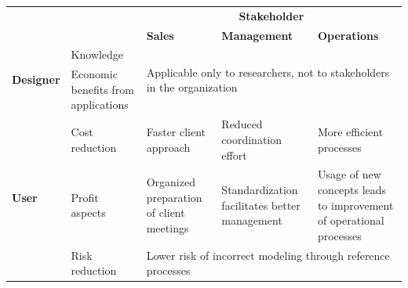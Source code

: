 \begin{table}[caption={Benefits of Reference Modelling for BPO-providers in CRM }, label=tab:refmodbpobenefits]
	\centering
	\begin{tabular}{p{1cm} p{2cm} |p{3cm} | p{3cm} | p{3cm} |}
		\cline{3-5}
		&                                     & \multicolumn{3}{c|}{\textbf{Stakeholder}}                                                                                                                                           \\ \cline{3-5} 
		&                                     & \textbf{Sales}                                          & \textbf{Management}                                 & \textbf{Operations}                                                 \\ \hline
		\multicolumn{1}{|l|}{\multirow{2}{*}{\textbf{Designer}}} & Knowledge                           & \multicolumn{3}{p{3cm}|}{\multirow{2}{*}{\parbox[c]{9cm}{Applicable only to researchers, not to stakeholders in the organization}}}                                                                       \\ \cline{2-2}
		\multicolumn{1}{|l|}{}                                   & Economic benefits from applications & \multicolumn{3}{l|}{}                                                                                                                                                               \\ \hline
		\multicolumn{1}{|l|}{\multirow{5}{*}{\textbf{User}}}     & Cost reduction                      & Faster client approach                                  & Reduced coordination effort                         & More efficient processes                                            \\ \cline{2-5} 
		\multicolumn{1}{|l|}{}                                   & Profit aspects                      & Organized preparation of client meetings                & Standardization facilitates better management       & Usage of new concepts leads to improvement of operational processes \\ \cline{2-5} 
		\multicolumn{1}{|l|}{}                                   & Risk reduction                      & \multicolumn{3}{l|}{\parbox[t]{9cm}{Lower risk of incorrect modeling through reference processes}}                                                                                                  \\ \cline{2-5} 

\end{tabular}
\end{table}
